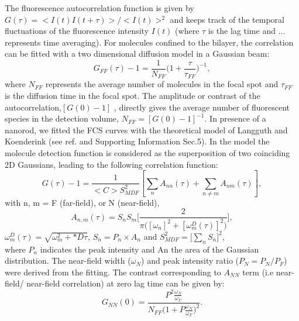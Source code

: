 \documentclass[journal=jacsat,manuscript=article]{achemso}
\begin{document}
The fluorescence autocorrelation function is given by $G(\tau)=<I(t)I(t+\tau)>/<I(t)>^2$ and keeps
track of the temporal fluctuations of the fluorescence intensity $I(t)$ (where $\tau$ is the lag time and
... represents time averaging). For molecules confined to the bilayer, the correlation can be fitted with a two dimensional diffusion model in a Gaussian beam:
\begin{equation}
	G_{FF}(\tau)-1 = \frac{1}{N_{FF}}\bigg(1+\frac{\tau}{\tau_{FF}} \bigg)^{-1},
	\label{eq:2D-gauss-diffusion}
\end{equation}
where $N_{FF}$ represents the average number of molecules in the focal spot and $\tau_{FF}$ is the diffusion time in the focal spot. The amplitude or contrast of the autocorrelation,$[G(0)-1]$ , directly gives the average number of fluorescent species in the detection volume, $N_{FF}=[G(0)-1]^{-1}$. In presence of a nanorod, we fitted the FCS curves with the theoretical model of Langguth and Koenderink (see ref.\cite{langguth2014simple} and Supporting Information Sec.5). In the model the molecule detection function is considered as the superposition of two coinciding 2D Gaussians, leading to the following correlation function:
\begin{equation}
	G(\tau)-1 = \frac{1}{<C>S_{MDF}^2}[\sum_{n}A_{nn}(\tau) + \sum_{n\neq m}A_{nm}(\tau)],
	\label{eqm:far-near-gauss}
\end{equation}
with n, m = F (far-field), or N (near-field),
\begin{equation}
	A_{n,m}(\tau)=S_nS_m\Bigg[\frac{2}{\pi\Big([\omega_n]^2 + [\omega_m^D(\tau)]^2 \Big)}\Bigg] ,
	\label{eqm:area-gauss}
\end{equation}
$\omega_m^D(\tau)=\sqrt{\omega_m^2 + *D\tau}$, $S_n=P_n\times A_n$ and $S_{MDF}^2=\Big[\sum_{n}S_n\Big]^2$,\\
where $P_n$ indicates the peak intensity and An the area of the Gaussian distribution. The near-field width ($\omega_N$) and peak intensity ratio ($P_N=P_N/P_F$) were derived from the fitting. The contrast corresponding to
$A_{NN}$ term (i.e near-field/ near-field correlation) at zero lag time can be given by:
\begin{equation}
	G_{NN}(0) = \frac{P^2\frac{\omega_N}{\omega_F}} {N_{FF}\Big(1+P\frac{\omega_N}{\omega_F}\Big)^2}.
	\label{eqm:contrast_enhnc}
\end{equation}
\end{document}
